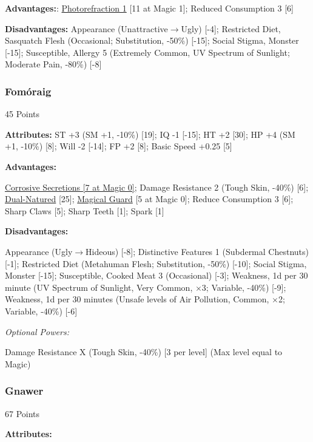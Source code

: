 \begin{multicols*}{3}
	\textbf{Advantages:}:
	\hyperref[photorefraction]{Photorefraction 1} [11 at Magic 1]; Reduced Consumption 3 [6]
	
	\textbf{Disadvantages:}	
	Appearance (Unattractive$\rightarrow$Ugly) [-4]; Restricted Diet, Sasquatch Flesh (Occasional; Substitution, -50\%) [-15]; Social Stigma, Monster [-15]; Susceptible, Allergy 5 (Extremely Common, UV Spectrum of Sunlight; Moderate Pain, -80\%) [-8] 
	
	\subsubsection{Fomóraig}\label{formoraig}
	\begin{flushright}
		45 Points
	\end{flushright}
	
	\textbf{Attributes:}
	ST +3 (SM +1, -10\%) [19]; IQ -1 [-15]; HT +2 [30]; HP +4 (SM +1, -10\%) [8]; Will -2 [-14]; FP +2 [8]; Basic Speed +0.25 [5]
	
	\textbf{Advantages:}

	\hyperref[corrosive_secretions]{Corrosive Secretions [7 at Magic 0]}; Damage Resistance 2 (Tough Skin, -40\%) [6]; \hyperref[dual_natured]{Dual-Natured} [25]; \hyperref[magical_guard]{Magical Guard} [5 at Magic 0]; Reduce Consumption 3 [6]; Sharp Claws [5]; Sharp Teeth [1]; Spark [1]
	
	\textbf{Disadvantages:}
	
	Appearance (Ugly$\rightarrow$Hideous) [-8]; Distinctive Features 1 (Subdermal Chestnuts) [-1]; Restricted Diet (Metahuman Flesh; Substitution, -50\%) [-10]; Social Stigma, Monster [-15]; Susceptible, Cooked Meat 3 (Occasional) [-3]; Weakness, 1d per 30 minute (UV Spectrum of Sunlight, Very Common, $\times$3; Variable, -40\%) [-9]; Weakness, 1d per 30 minutes (Unsafe levels of Air Pollution, Common, $\times$2; Variable, -40\%) [-6]
	
	\textit{Optional Powers:}
	
	Damage Resistance X (Tough Skin, -40\%) [3 per level] (Max level equal to Magic)
	
	\subsubsection{Gnawer}\label{gnawer}
	\begin{flushright}
		67 Points
	\end{flushright}

	\textbf{Attributes:}
	

\end{multicols*}
